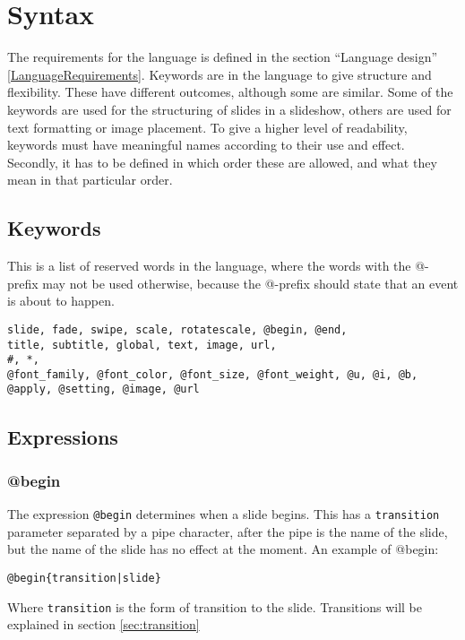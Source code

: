 \chapter{Syntax}
\label{SSyntax}

The requirements for the language is defined in the section ``Language design'' \ref{LanguageRequirements}. Keywords are in the language to give structure and flexibility. These have different outcomes, although some are similar. Some of the keywords are used for the structuring of slides in a slideshow, others are used for text formatting or image placement. To give a higher level of readability, keywords must have meaningful names according to their use and effect. Secondly, it has to be defined in which order these are allowed, and what they mean in that particular order.

\section{Keywords}
This is a list of reserved words in the language, where the words with the @-prefix may not be used otherwise, because the @-prefix should state that an event is about to happen.

\begin{lstlisting}[frame=single]
slide, fade, swipe, scale, rotatescale, @begin, @end, 
title, subtitle, global, text, image, url,  
#, *, 
@font_family, @font_color, @font_size, @font_weight, @u, @i, @b, 
@apply, @setting, @image, @url
\end{lstlisting}

\section{Expressions}

\subsection{@begin}
\label{@begin}
The expression \texttt{@begin} determines when a slide begins. This has a \texttt{transition} parameter separated by a pipe character, after the pipe is the name of the slide, but the name of the slide has no effect at the moment. An example of @begin:
\begin{lstlisting}[frame=single]
@begin{transition|slide}
\end{lstlisting}
Where \texttt{transition} is the form of transition to the slide. Transitions will be explained in section \ref{sec:transition}

